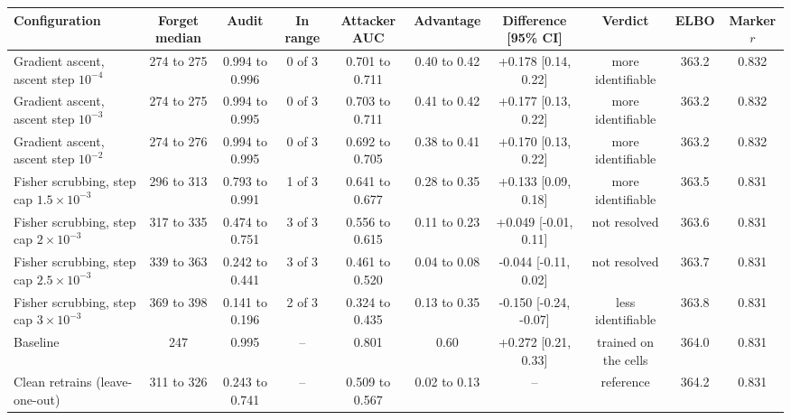 \begin{tabular}{lccccccccc}
\toprule
Configuration & Forget median & Audit & In range & Attacker AUC & Advantage & Difference [95\% CI] & Verdict & ELBO & Marker $r$ \\
\midrule
Gradient ascent, ascent step $10^{-4}$ & 274 to 275 & 0.994 to 0.996 & 0 of 3 & 0.701 to 0.711 & 0.40 to 0.42 & +0.178 [0.14, 0.22] & more identifiable & 363.2 & 0.832 \\
Gradient ascent, ascent step $10^{-3}$ & 274 to 275 & 0.994 to 0.995 & 0 of 3 & 0.703 to 0.711 & 0.41 to 0.42 & +0.177 [0.13, 0.22] & more identifiable & 363.2 & 0.832 \\
Gradient ascent, ascent step $10^{-2}$ & 274 to 276 & 0.994 to 0.995 & 0 of 3 & 0.692 to 0.705 & 0.38 to 0.41 & +0.170 [0.13, 0.22] & more identifiable & 363.2 & 0.832 \\
Fisher scrubbing, step cap $1.5\times 10^{-3}$ & 296 to 313 & 0.793 to 0.991 & 1 of 3 & 0.641 to 0.677 & 0.28 to 0.35 & +0.133 [0.09, 0.18] & more identifiable & 363.5 & 0.831 \\
Fisher scrubbing, step cap $2\times 10^{-3}$ & 317 to 335 & 0.474 to 0.751 & 3 of 3 & 0.556 to 0.615 & 0.11 to 0.23 & +0.049 [-0.01, 0.11] & not resolved & 363.6 & 0.831 \\
Fisher scrubbing, step cap $2.5\times 10^{-3}$ & 339 to 363 & 0.242 to 0.441 & 3 of 3 & 0.461 to 0.520 & 0.04 to 0.08 & -0.044 [-0.11, 0.02] & not resolved & 363.7 & 0.831 \\
Fisher scrubbing, step cap $3\times 10^{-3}$ & 369 to 398 & 0.141 to 0.196 & 2 of 3 & 0.324 to 0.435 & 0.13 to 0.35 & -0.150 [-0.24, -0.07] & less identifiable & 363.8 & 0.831 \\
\midrule
Baseline & 247 & 0.995 & -- & 0.801 & 0.60 & +0.272 [0.21, 0.33] & trained on the cells & 364.0 & 0.831 \\
Clean retrains (leave-one-out) & 311 to 326 & 0.243 to 0.741 & -- & 0.509 to 0.567 & 0.02 to 0.13 & -- & reference & 364.2 & 0.831 \\
\bottomrule
\end{tabular}
